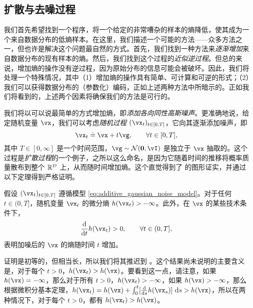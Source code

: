 \documentclass[../../book-main.tex]{subfiles}
\begin{document}
\subsection{扩散与去噪过程} \label{sub:intro_diffusion_denoising}

我们首先希望找到一个程序，将一个给定的非常嘈杂的样本的熵降低，使其成为一个来自数据分布的低熵样本。在这里，我们描述一个可能的方法——众多方法之一，但也许是解决这个问题最自然的方式。首先，我们找到一种方法来\textit{逐渐增加}来自数据分布的现有样本的熵。然后，我们找到这个过程的\textit{近似逆过程}。但总的来说，增加熵的操作没有逆过程，因为原始分布的信息可能会被破坏。因此，我们将处理一个特殊情况，其中（1）增加熵的操作具有简单、可计算和可逆的形式；（2）我们可以获得数据分布的（参数化）编码，正如上述两种方法中所暗示的。正如我们将看到的，上述两个因素将确保我们的方法是可行的。

我们将以可以说最简单的方式增加熵，即\textit{添加各向同性高斯噪声}。更准确地说，给定随机变量 \(\vx\)，我们可以考虑\textit{随机过程} \((\vx_{t})_{t \in [0, T]}\)，它向其逐渐添加噪声，即
\begin{equation}\label{eq:additive_gaussian_noise_model}
	\vx_{t} \doteq \vx + t\vg, \qquad \forall t \in [0, T],
\end{equation}
其中 \(T \in [0, \infty]\) 是一个时间范围，\(\vg \sim \dNorm(\vzero, \vI)\) 是独立于 \(\vx\) 抽取的。这个过程是\textit{扩散过程}的一个例子，之所以这么命名，是因为它随着时间的推移将概率质量散布到整个 \(\mathbb{R}^{D}\) 上，从而随时间增加熵。这个直觉得到了  的图形证实，并通过以下定理得到严格证明。
\begin{theorem}
	假设 \((\vx_{t})_{t \in [0, T]}\) 遵循模型 \eqref{eq:additive_gaussian_noise_model}。对于任何 \(t \in (0, T]\)，随机变量 \(\vx_{t}\) 的微分熵 \(h(\vx_{t}) > -\infty\)。此外，在 \(\vx\) 的某些技术条件下，
	\begin{equation}
		\odv*{h(\vx_{t})}{t} > 0, \qquad \forall t \in (0, T],
	\end{equation}
	表明加噪后的 \(\vx\) 的熵随时间 \(t\) 增加。
\end{theorem}
证明是初等的，但相当长，所以我们将其推迟到 。这个结果尚未说明的主要含义是，对于每个 \(t > 0\)，\(h(\vx_{t}) > h(\vx)\)。要看到这一点，请注意，如果 \(h(\vx) = -\infty\)，那么对于所有 \(t > 0\)，\(h(\vx_{t}) > -\infty\)，如果 \(h(\vx) > -\infty\)，那么根据微积分基本定理，\(h(\vx_{t}) = h(\vx) + \int_{0}^{t}[\odv*{h(\vx_{s})}{s}]\odif{s} > h(\vx)\)，所以在两种情况下，对于每个 \(t > 0\)，都有 \(h(\vx_{t}) > h(\vx)\)。
\end{document}
